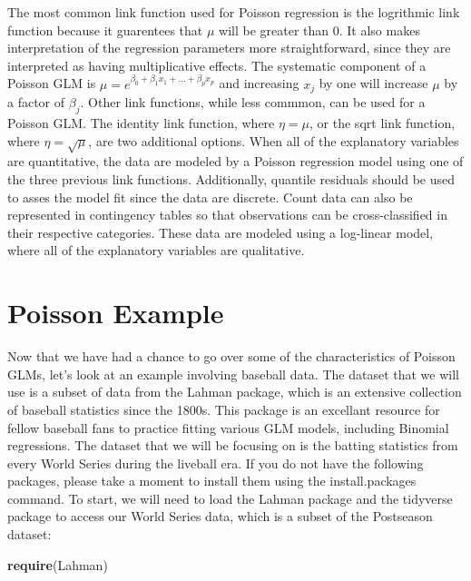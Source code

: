 \documentclass[
]{book}
\newenvironment{Shaded}{\begin{snugshade}}{\end{snugshade}}
\newcommand{\KeywordTok}[1]{\textcolor[rgb]{0.13,0.29,0.53}{\textbf{#1}}}
\newcommand{\NormalTok}[1]{#1}
\begin{document}
The most common link function used for Poisson regression is the logrithmic link function because it guarentees that \(\mu\) will be greater than 0. It also makes interpretation of the regression parameters more straightforward, since they are interpreted as having multiplicative effects. The systematic component of a Poisson GLM is \(\mu = e^{\beta_0 + \beta_1x_1 + ... + \beta_px_p}\) and increasing \(x_j\) by one will increase \(\mu\) by a factor of \(\beta_j\). Other link functions, while less commmon, can be used for a Poisson GLM. The identity link function, where \(\eta = \mu\), or the sqrt link function, where \(\eta = \sqrt{\mu}\), are two additional options. When all of the explanatory variables are quantitative, the data are modeled by a Poisson regression model using one of the three previous link functions. Additionally, quantile residuals should be used to asses the model fit since the data are discrete. Count data can also be represented in contingency tables so that observations can be cross-classified in their respective categories. These data are modeled using a log-linear model, where all of the explanatory variables are qualitative.

\hypertarget{poisson-example}{%
\section{Poisson Example}\label{poisson-example}}

Now that we have had a chance to go over some of the characteristics of Poisson GLMs, let's look at an example involving baseball data. The dataset that we will use is a subset of data from the Lahman package, which is an extensive collection of baseball statistics since the 1800s. This package is an excellant resource for fellow baseball fans to practice fitting various GLM models, including Binomial regressions. The dataset that we will be focusing on is the batting statistics from every World Series during the liveball era. If you do not have the following packages, please take a moment to install them using the install.packages command. To start, we will need to load the Lahman package and the tidyverse package to access our World Series data, which is a subset of the Postseason dataset:

\begin{Shaded}
\begin{Highlighting}[]
\KeywordTok{require}\NormalTok{(Lahman)}
\end{Highlighting}
\end{Shaded}
\end{document}
